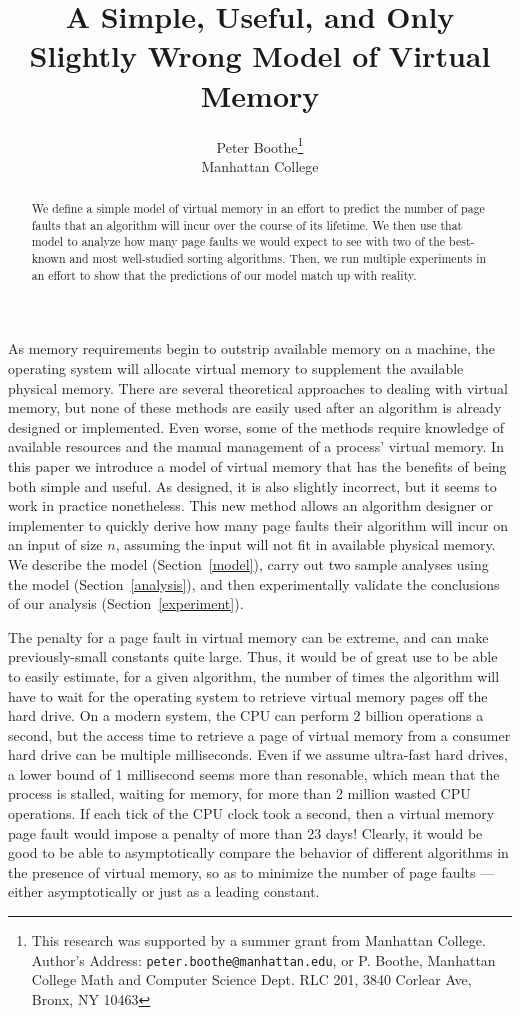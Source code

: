 \documentclass[11pt]{article}
\title{A Simple, Useful, and Only Slightly Wrong Model of Virtual Memory}
\author{Peter Boothe\thanks{This research was supported by a summer grant from Manhattan College.
Author's Address: \texttt{peter.boothe@manhattan.edu}, or P. Boothe, Manhattan College Math and Computer Science Dept. RLC 201, 3840 Corlear Ave, Bronx, NY 10463
}\\
Manhattan College
}
\begin{document}
 

\maketitle 

\begin{abstract} 
We define a simple model of virtual memory in an effort to predict the number
of page faults that an algorithm will incur over the course of its lifetime.
We then use that model to analyze how many page faults we would expect to see
with two of the best-known and most well-studied sorting algorithms.  Then, we
run multiple experiments in an effort to show that the predictions of our model
match up with reality.
\end{abstract} 


As memory requirements begin to outstrip available memory on a machine, the
operating system will allocate virtual memory to supplement the available
physical memory.  There are several theoretical approaches to dealing with
virtual memory, but none of these methods are easily used after an algorithm is
already designed or implemented.  Even worse, some of the methods require
knowledge of available resources and the manual management of a process'
virtual memory.  In this paper we introduce a model of virtual memory that has
the benefits of being both simple and useful.  As designed, it is also slightly
incorrect, but it seems to work in practice nonetheless.  This new method
allows an algorithm designer or implementer to quickly derive how many page
faults their algorithm will incur on an input of size $n$, assuming the input
will not fit in available physical memory.  We describe the model
(Section~\ref{model}), carry out two sample analyses using the model
(Section~\ref{analysis}), and then experimentally validate the conclusions of
our analysis (Section~\ref{experiment}). 

The penalty for a page fault in virtual memory can be extreme, and can make
previously-small constants quite large. Thus, it would be of great use to be
able to easily estimate, for a given algorithm, the number of times the
algorithm will have to wait for the operating system to retrieve virtual memory
pages off the hard drive.  On a modern system, the CPU can perform 2 billion
operations a second, but the access time to retrieve a page of virtual memory
from a consumer hard drive can be multiple milliseconds.  Even if we assume
ultra-fast hard drives, a lower bound of 1 millisecond seems more than
resonable, which mean that the process is stalled, waiting for memory, for more
than 2 million wasted CPU operations.  If each tick of the CPU clock took a
second, then a virtual memory page fault would impose a penalty of more than 23
days!  Clearly, it would be good to be able to asymptotically compare the
behavior of different algorithms in the presence of virtual memory, so as to
minimize the number of page faults --- either asymptotically or just as a leading constant\cite{queue}. 
\end{document}
